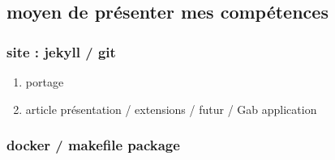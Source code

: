 \documentclass[11pt]{article}
\begin{document}
\subsection{moyen de présenter mes compétences}
\label{sec:orge434034}
\subsubsection{site : jekyll / git}
\label{sec:orgbdf5ebb}
\begin{enumerate}
\item portage
\label{sec:org685229d}
\item article présentation / extensions / futur / Gab application
\label{sec:org5fef917}
\end{enumerate}
\subsubsection{docker / makefile package}
\label{sec:orgb412e7a}
\end{document}
